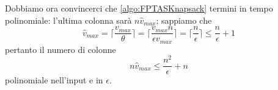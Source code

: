 Dobbiamo ora convincerci che \cref{algo:FPTASKnapsack} termini
in tempo polinomiale: l'ultima colonna sarà $n \hat{v}_{max}$;
sappiamo che
$$
	\hat{v}_{max} = \lceil \frac{v_{max}}{\theta} \rceil = \lceil \frac{v_{max} n}{\epsilon v_{max}} \rceil
	=\lceil \frac{n}{\epsilon}\rceil \leq \frac{n}{\epsilon} + 1
$$
pertanto il numero di colonne
$$
	n\hat{v}_{max} \leq \frac{n^2}{\epsilon} + n
$$
polinomiale nell'input e in $\epsilon$.
